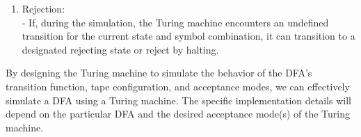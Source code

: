 \begin{enumerate}
\item Rejection:\\
   - If, during the simulation, the Turing machine encounters an undefined transition for the current state and symbol combination, it can transition to a designated rejecting state or reject by halting.
\end{enumerate}
By designing the Turing machine to simulate the behavior of the DFA's transition function, tape configuration, and acceptance modes, we can effectively simulate a DFA using a Turing machine. The specific implementation details will depend on the particular DFA and the desired acceptance mode(s) of the Turing machine.